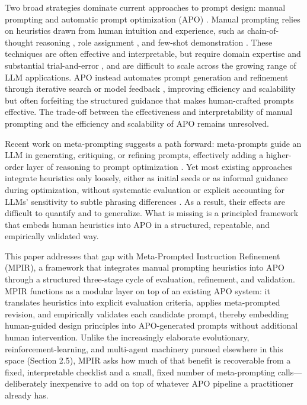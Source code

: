 \documentclass[a4paper,fleqn]{cas-sc}
\begin{document}
Two broad strategies dominate current approaches to prompt design: manual prompting and automatic prompt optimization (APO) \citep{liu2023}. Manual prompting relies on heuristics drawn from human intuition and experience, such as chain-of-thought reasoning \citep{wei2022}, role assignment \citep{kong2024}, and few-shot demonstration \citep{brown2020}. These techniques are often effective and interpretable, but require domain expertise \citep{reynolds2021,zamfirescupereira2023} and substantial trial-and-error \citep{mayilvaghanan2025}, and are difficult to scale across the growing range of LLM applications. APO instead automates prompt generation and refinement through iterative search or model feedback \citep{pryzant2023,guo2024}, improving efficiency and scalability but often forfeiting the structured guidance that makes human-crafted prompts effective. The trade-off between the effectiveness and interpretability of manual prompting and the efficiency and scalability of APO remains unresolved.

Recent work on meta-prompting suggests a path forward: meta-prompts guide an LLM in generating, critiquing, or refining prompts, effectively adding a higher-order layer of reasoning to prompt optimization \citep{yang2024b,mayilvaghanan2025}. Yet most existing approaches integrate heuristics only loosely, either as initial seeds or as informal guidance during optimization, without systematic evaluation or explicit accounting for LLMs' sensitivity to subtle phrasing differences \citep{errica2025}. As a result, their effects are difficult to quantify and to generalize. What is missing is a principled framework that embeds human heuristics into APO in a structured, repeatable, and empirically validated way.

This paper addresses that gap with Meta-Prompted Instruction Refinement (MPIR), a framework that integrates manual prompting heuristics into APO through a structured three-stage cycle of evaluation, refinement, and validation. MPIR functions as a modular layer on top of an existing APO system: it translates heuristics into explicit evaluation criteria, applies meta-prompted revision, and empirically validates each candidate prompt, thereby embedding human-guided design principles into APO-generated prompts without additional human intervention. Unlike the increasingly elaborate evolutionary, reinforcement-learning, and multi-agent machinery pursued elsewhere in this space (Section 2.5), MPIR asks how much of that benefit is recoverable from a fixed, interpretable checklist and a small, fixed number of meta-prompting calls---deliberately inexpensive to add on top of whatever APO pipeline a practitioner already has.
\end{document}
